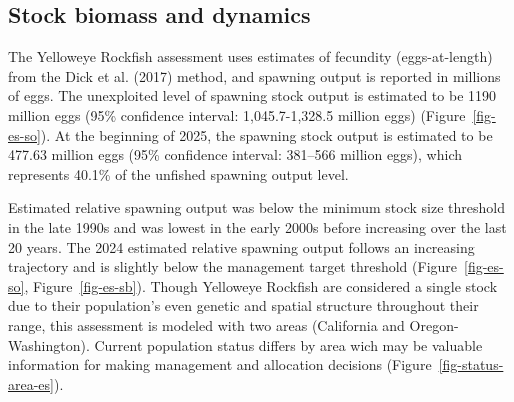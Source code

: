 \documentclass[
]{scrartcl}
\begin{document}
\subsection*{Stock biomass and
dynamics}\label{stock-biomass-and-dynamics}

The Yelloweye Rockfish assessment uses estimates of fecundity
(eggs-at-length) from the Dick et al. (2017) method, and spawning output
is reported in millions of eggs. The unexploited level of spawning stock
output is estimated to be 1190 million eggs (95\% confidence interval:
1,045.7-1,328.5 million eggs) (Figure~\ref{fig-es-so}). At the beginning
of 2025, the spawning stock output is estimated to be 477.63 million
eggs (95\% confidence interval: 381--566 million eggs), which represents
40.1\% of the unfished spawning output level.

Estimated relative spawning output was below the minimum stock size
threshold in the late 1990s and was lowest in the early 2000s before
increasing over the last 20 years. The 2024 estimated relative spawning
output follows an increasing trajectory and is slightly below the
management target threshold (Figure~\ref{fig-es-so},
Figure~\ref{fig-es-sb}). Though Yelloweye Rockfish are considered a
single stock due to their population's even genetic and spatial
structure throughout their range, this assessment is modeled with two
areas (California and Oregon-Washington). Current population status
differs by area wich may be valuable information for making management
and allocation decisions (Figure~\ref{fig-status-area-es}).

\begingroup
\fontsize{9.0pt}{10.8pt}\selectfont
\end{document}
